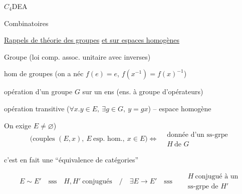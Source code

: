 $C_{4}$\qquad DEA

 Combinatoires

\uline{Rappels de théorie des groupes} \uline{et sur espaces homogènes}

Groupe (loi comp. assoc. unitaire avec inverses)

hom de groupes (on a néc $f(e)=e$, $f(x^{-1})=f(x)^{-1}$)

opération d'un groupe $G$ sur un ens (ens. à groupe d'opérateurs)

opération transitive ($\forall x\mathord{.}y\in E,\ \exists g\in G,\ y=gx$) -- espace homogène

On exige  $E\ne\varnothing$)
\[
\bigl(\text{couples }(E,x),\ E\ \text{esp. hom.},\ x\in E\bigr)
\Longleftrightarrow
\begin{aligned}&\text{donnée d'un ss-grpe}\\&H\ \text{de }G\end{aligned}
\]

c'est en fait une ``équivalence de catégories''

{\small
{}}
{\small
\[
E\sim E'\quad\text{sss}\quad H,H'\ \text{conjugués}\quad\big/\quad
\exists E\to E'\quad\text{sss}\quad
\begin{aligned}&H\ \text{conjugué à un}\\[-2pt]&\text{ss-grpe de }H'\end{aligned}
\]}

